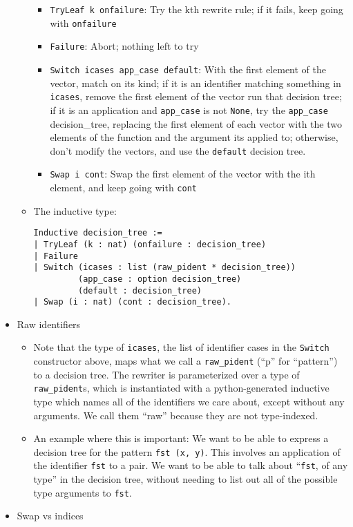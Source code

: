 \begin{itemize}
\begin{itemize}
    \begin{itemize}
    \tightlist
    \item
      \texttt{TryLeaf\ k\ onfailure}: Try the kth rewrite rule; if it
      fails, keep going with \texttt{onfailure}
    \item
      \texttt{Failure}: Abort; nothing left to try
    \item
      \texttt{Switch\ icases\ app\_case\ default}: With the first
      element of the vector, match on its kind; if it is an identifier
      matching something in \texttt{icases}, remove the first element of
      the vector run that decision tree; if it is an application and
      \texttt{app\_case} is not \texttt{None}, try the
      \texttt{app\_case} decision\_tree, replacing the first element of
      each vector with the two elements of the function and the argument
      its applied to; otherwise, don't modify the vectors, and use the
      \texttt{default} decision tree.
    \item
      \texttt{Swap\ i\ cont}: Swap the first element of the vector with
      the ith element, and keep going with \texttt{cont}
    \end{itemize}
  \item
    The inductive type:

\begin{verbatim}
Inductive decision_tree :=
| TryLeaf (k : nat) (onfailure : decision_tree)
| Failure
| Switch (icases : list (raw_pident * decision_tree))
         (app_case : option decision_tree)
         (default : decision_tree)
| Swap (i : nat) (cont : decision_tree).
\end{verbatim}
  \end{itemize}
\item
  Raw identifiers

  \begin{itemize}
  \tightlist
  \item
    Note that the type of \texttt{icases}, the list of identifier cases
    in the \texttt{Switch} constructor above, maps what we call a
    \texttt{raw\_pident} (``p'' for ``pattern'') to a decision tree. The
    rewriter is parameterized over a type of \texttt{raw\_pident}s,
    which is instantiated with a python-generated inductive type which
    names all of the identifiers we care about, except without any
    arguments. We call them ``raw'' because they are not type-indexed.
  \item
    An example where this is important: We want to be able to express a
    decision tree for the pattern \texttt{fst\ (x,\ y)}. This involves
    an application of the identifier \texttt{fst} to a pair. We want to
    be able to talk about ``\texttt{fst}, of any type'' in the decision
    tree, without needing to list out all of the possible type arguments
    to \texttt{fst}.
  \end{itemize}
\item
  Swap vs indices


\end{itemize}

